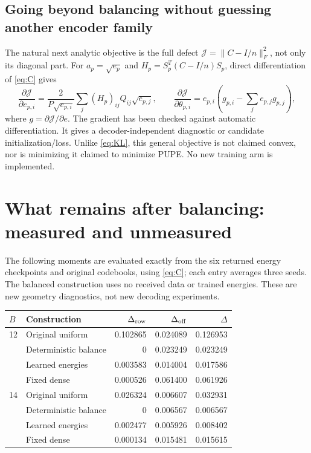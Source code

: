 \documentclass[10pt,a4paper]{article}
\begin{document}
\subsection{Going beyond balancing without guessing another encoder family}
The natural next analytic objective is the full defect $\mathcal J=\|C-I/n\|_F^2$, not only its diagonal part.
For $a_p=\sqrt{e_p}$ and $H_p=S_p^T(C-I/n)S_p$, direct differentiation of \eqref{eq:C} gives
\begin{equation}
 \frac{\partial\mathcal J}{\partial e_{p,i}}
 =\frac{2}{P\sqrt{e_{p,i}}}\sum_j(H_p)_{ij}Q_{ij}\sqrt{e_{p,j}},\qquad
 \frac{\partial\mathcal J}{\partial\theta_{p,i}}
 =e_{p,i}\left(g_{p,i}-\sum_j e_{p,j}g_{p,j}\right),
 \label{eq:gradient}
\end{equation}
where $g=\partial\mathcal J/\partial e$. The gradient has been checked against automatic differentiation.
It gives a decoder-independent diagnostic or candidate initialization/loss. Unlike \eqref{eq:KL}, this general
objective is not claimed convex, nor is minimizing it claimed to minimize PUPE. No new training arm is implemented.

\clearpage
\section{What remains after balancing: measured and unmeasured}
The following moments are evaluated exactly from the six returned energy checkpoints and original codebooks,
using \eqref{eq:C}; each entry averages three seeds. The balanced construction uses no received data or trained energies.
These are new geometry diagnostics, not new decoding experiments.

\begin{center}
\begin{tabular}{llrrr}
\toprule
$B$ & Construction & $\Delta_{\rm row}$ & $\Delta_{\rm off}$ & $\Delta$\\
\midrule
12 & Original uniform & 0.102865 & 0.024089 & 0.126953\\
   & Deterministic balance & 0 & 0.023249 & 0.023249\\
   & Learned energies & 0.003583 & 0.014004 & 0.017586\\
   & Fixed dense & 0.000526 & 0.061400 & 0.061926\\
\midrule
14 & Original uniform & 0.026324 & 0.006607 & 0.032931\\
   & Deterministic balance & 0 & 0.006567 & 0.006567\\
   & Learned energies & 0.002477 & 0.005926 & 0.008402\\
   & Fixed dense & 0.000134 & 0.015481 & 0.015615\\
\bottomrule
\end{tabular}
\end{center}
\end{document}
